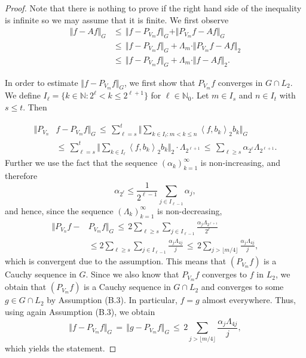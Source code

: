 \documentclass[a4paper,12pt]{amsart}
\theoremstyle{definition}
\theoremstyle{remark}
\newcommand{\ipr}[2]{\left\langle#1,#2\right\rangle}
\begin{document}
 
 \begin{proof}
Note that there is nothing to prove if the right hand side of the inequality %
is infinite
 so we may assume that it is finite.
We first observe
\begin{align*}
 \Vert f - A f  \Vert_{G}
&\le\, \Vert f - P_{V_m} f \Vert_{G} + \Vert P_{V_m} f - A f \Vert_{G}\\
&\le\, \Vert f - P_{V_m} f \Vert_{G} + \Lambda_m \cdot \Vert P_{V_m}f - A f \Vert_{2}\\
&\le\, \Vert f - P_{V_m} f \Vert_{G} + \Lambda_m \cdot \Vert f - A f \Vert_{2}.
\end{align*}


In order to estimate $\Vert f - P_{V_m} f \Vert_G$,
we first 
show that $P_{V_m} f$ converges in $G\cap L_2$.
We 
 {define}
$I_\ell = \{ k \in \mathbb{N} \colon 2^{\ell}<  k \leq 2^{\ell+1}\}$ for $\ell\in\mathbb{N}_0$. Let $m\in I_s$ and $n\in I_t$ with $s\le t$. Then

\begin{align*}
\Vert P_{V_n} &f - P_{V_m} f \Vert_G  \,\le\,
\sum_{\ell=s}^t
\bigg\Vert\sum\limits_{ k\in I_\ell\colon m<k\le n} \ipr{f}{b_k}_2 b_k \bigg\Vert_G
\\ 
&\le\,
\sum_{\ell=s}^t
\bigg\Vert\sum\limits_{ k\in I_\ell} \ipr{f}{b_k}_2 b_k \bigg\Vert_2
  \cdot \Lambda_{2^{\ell+1}}
 \,\leq\, \sum_{\ell \geq s}  \alpha_{2^\ell} \Lambda_{2^{\ell+1}}.
\end{align*}
 Further we use the fact that the sequence $(\alpha_k)_{k=1}^\infty$
 is non-increasing, and therefore
\begin{equation*}%
\alpha_{2^\ell} \leq   \frac{1}{2^{\ell-1}} \sum\limits_{j\in I_{\ell-1}}  {\alpha_j,}
	\end{equation*} 
and hence, since the sequence $(\Lambda_k)_{k=1}^\infty$
is non-decreasing,
\[
\begin{split}
\Vert P_{V_n} f - &P_{V_m} f \Vert_G
 \,\leq\, 2\sum_{\ell \geq s}  \sum\limits_{ j\in I_{\ell-1}}
\frac{\alpha_j \Lambda_{2^{\ell+1}}}{2^{\ell} } 
\\
& \leq 2\sum_{\ell \geq s}  \sum\limits_{ j\in I_{\ell-1}}
\frac{\alpha_j \Lambda_{4j}}{j}   
\,\le\, 2 \sum_{j > \lfloor m/4 \rfloor} \frac{ \alpha_j \Lambda_{4j}}{j},
\end{split}
\]
which is convergent due to the assumption.
This means that $(P_{V_m} f)$ is a Cauchy sequence in $G$.
Since we also know that $P_{V_m} f$ converges to $f$ in $L_2$, 
we obtain that  $(P_{V_m} f)$ is a Cauchy sequence in $G\cap L_2$ and converges to some $g\in G\cap L_2$ by Assumption (B.3). In particular, $f=g$ almost everywhere.
 Thus, using again Assumption (B.3), we obtain 
\[
 \Vert f - P_{V_m} f \Vert_G \,=\,
 \Vert g - P_{V_m} f \Vert_G \,\le\, 
 2 \sum_{j > \lfloor m/4 \rfloor} \frac{ \alpha_j \Lambda_{4j}}{j},
\]
which yields the statement.
 \end{proof}
\end{document}
